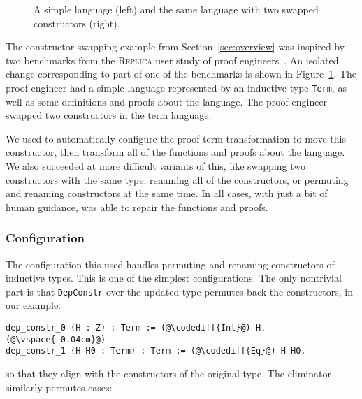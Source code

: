 \begin{figure}
\begin{minipage}{0.48\textwidth}
   
\end{minipage}
\hfill
\begin{minipage}{0.48\textwidth}
   
\end{minipage}
\vspace{-0.3cm}
\caption{A simple language (left) and the same language with two swapped constructors (right).}
\label{fig:replica}
\end{figure}

The constructor swapping example from Section~\ref{sec:overview} was inspired by two benchmarks 
from the \textsc{Replica} user study of proof engineers~\cite{replica}.
An isolated change corresponding to part of one of the benchmarks is shown in Figure~\ref{fig:replica}.
The proof engineer had a simple language represented by an inductive type \lstinline{Term},
as well as some definitions and proofs about the language.
The proof engineer swapped two constructors in the term language.

We used \toolname to automatically configure the proof term transformation to move this constructor,
then transform all of the functions and proofs about the language.
We also succeeded at more difficult variants of this,
like swapping two constructors with the same type, renaming all of the constructors,
or permuting and renaming constructors at the same time.
In all cases, with just a bit of human guidance, \toolname was able to repair the functions and proofs.

\subsubsection{Configuration}

The configuration this used handles permuting and renaming constructors of inductive types.
This is one of the simplest configurations.
The only nontrivial part is that \lstinline{DepConstr} over the updated type permutes back the constructors, in our example:

\begin{lstlisting}[backgroundcolor=\color{cyan!30}]
dep_constr_0 (H : Z) : Term := (@\codediff{Int}@) H.(@\vspace{-0.04cm}@)
dep_constr_1 (H H0 : Term) : Term := (@\codediff{Eq}@) H H0.
\end{lstlisting}
so that they align with the constructors of the original type.
The eliminator similarly permutes cases:

